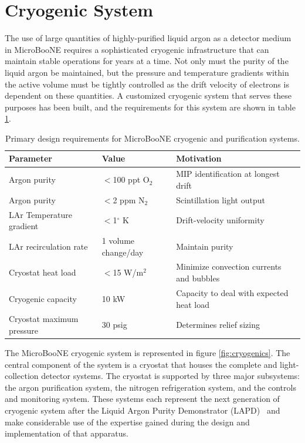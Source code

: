 \section{Cryogenic System}
\label{sec:cryostat}

The use of large quantities of highly-purified liquid argon as a detector medium in MicroBooNE requires a sophisticated cryogenic infrastructure that can maintain stable operations for years at a time.  Not only must the purity of the liquid argon be maintained, but the pressure and temperature gradients within the \lartpc active volume must be tightly controlled as the drift velocity of electrons is dependent on these quantities.  A customized cryogenic system that serves these purposes has been built, and the requirements for this system are shown in table \ref{tab:cryoreq}.

\begin{table}[!htb]
   \centering
    \caption{Primary design requirements for MicroBooNE cryogenic and purification systems.} 
    \begin{tabular}{lll} %
    \hline
    Parameter & Value & Motivation\\
    \hline
      Argon purity    & $<$100 ppt O$_2$ & MIP identification at longest drift\\
      Argon purity    & $<$2 ppm N$_2$ & Scintillation light output\\
      LAr Temperature gradient & $<$1$^\circ$ K & Drift-velocity uniformity\\
      LAr recirculation rate & 1 volume change/day & Maintain purity\\
      Cryostat heat load & $<$15 W/m$^2$ & Minimize convection currents and bubbles\\
      Cryogenic capacity & 10 kW & Capacity to deal with expected heat load\\
      Cryostat maximum pressure & 30 psig & Determines relief sizing\\
            \hline
   \end{tabular}
   \label{tab:cryoreq}
\end{table} 

The MicroBooNE cryogenic system is represented in figure \ref{fig:cryogenics}.  The central component of the system is a cryostat that houses the complete \lartpc and light-collection detector systems.  The cryostat is supported by three major subsystems: the argon purification system, the nitrogen refrigeration system, and the controls and monitoring system.  These systems each represent the next generation of \lartpc cryogenic system after the Liquid Argon Purity Demonstrator (LAPD)~\cite{Adamowski:2014-LAPD} and make considerable use of the expertise gained during the design and implementation of that apparatus.  %

